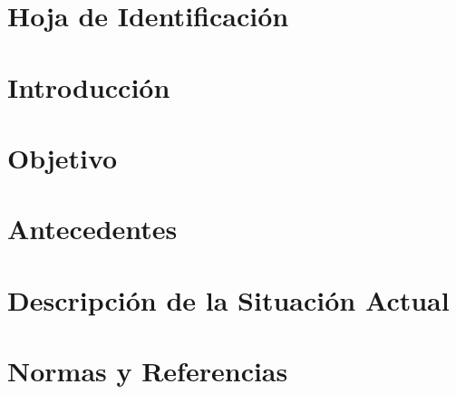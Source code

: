 
\setcounter{chapter}{-1}

\titleformat{\chapter}[display]{\normalfont\bfseries}{}{0pt}{\Large}
\titlespacing*{\chapter}{0pt}{10pt}{20pt}

\chapter[Hoja de Identificación]{
    \thispagestyle{empty}
    \normalsize
    \mdseries
    \Huge\bf{Hoja de Identificación}
}

\setcounter{page}{1}

\newpage



\chapter{Introducción}


\chapter{Objetivo}


\chapter{Antecedentes}


\chapter{Descripción de la Situación Actual}


\chapter{Normas y Referencias}


